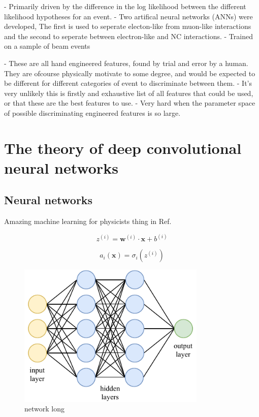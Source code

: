 - Primarily driven by the difference in the log likelihood between the different likelihood
hypotheses for an event.
- Two artifical neural networks (ANNs) were developed, The first is used to seperate electon-like
from muon-like interactions and the second to seperate between electron-like and NC interactions.
- Trained on a sample of beam events

- These are all hand engineered features, found by trial and error by a human. They are ofcourse
physically motivate to some degree, and would be expected to be different for different categories
of event to discriminate between them.
- It's very unlikely this is firstly and exhaustive list of all features that could be used, or
that these are the best features to use.
- Very hard when the parameter space of possible discriminating engineered features is so large.


\section{The theory of deep convolutional neural networks} %
\label{sec:cvn_theory} %

\subsection{Neural networks} %
\label{sec:cvn_theory_basic} %

Amazing machine learning for physicists thing in Ref.~\cite{mehta2019}

\begin{equation} %
    z^{(i)}=\boldsymbol{w}^{(i)}\cdot\boldsymbol{x}+b^{(i)}
\end{equation}

\begin{equation} %
    a_{i}(\boldsymbol{x})=\sigma_i(z^{(i)})
\end{equation}

\begin{figure} %
    \includegraphics[width=0.8\textwidth]{diagrams/7-cvn/network.pdf}
    \caption[network short]
    {network long}
    \label{fig:network}
\end{figure}

